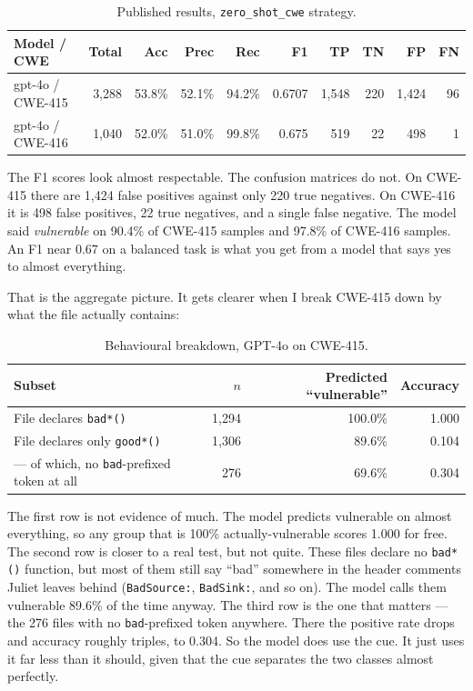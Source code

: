 \documentclass[11pt]{article}
\begin{document}
\begin{table}[h!]
\centering
\begin{tabular}{lrrrrrrrrr}
\toprule
Model / CWE & Total & Acc & Prec & Rec & F1 & TP & TN & FP & FN \\
\midrule
gpt-4o / CWE-415 & 3,288 & 53.8\% & 52.1\% & 94.2\% & 0.6707 & 1,548 & 220 & 1,424 & 96 \\
gpt-4o / CWE-416 & 1,040 & 52.0\% & 51.0\% & 99.8\% & 0.675 & 519 & 22 & 498 & 1 \\
\bottomrule
\end{tabular}
\caption{Published results, \texttt{zero\_shot\_cwe} strategy.}
\end{table}

The F1 scores look almost respectable. The confusion matrices do not. On CWE-415 there are 1,424
false positives against only 220 true negatives. On CWE-416 it is 498 false positives, 22 true
negatives, and a single false negative. The model said \textit{vulnerable} on 90.4\% of CWE-415
samples and 97.8\% of CWE-416 samples. An F1 near 0.67 on a balanced task is what you get from a
model that says yes to almost everything.

That is the aggregate picture. It gets clearer when I break CWE-415 down by what the file
actually contains:

\begin{table}[h!]
\centering
\begin{tabular}{lrrr}
\toprule
Subset & $n$ & Predicted ``vulnerable'' & Accuracy \\
\midrule
File declares \texttt{bad*()} & 1,294 & 100.0\% & 1.000 \\
File declares only \texttt{good*()} & 1,306 & 89.6\% & 0.104 \\
\quad --- of which, no \texttt{bad}-prefixed token at all & 276 & 69.6\% & 0.304 \\
\bottomrule
\end{tabular}
\caption{Behavioural breakdown, GPT-4o on CWE-415.}
\end{table}

The first row is not evidence of much. The model predicts vulnerable on almost everything, so any
group that is 100\% actually-vulnerable scores 1.000 for free. The second row is closer to a real
test, but not quite. These files declare no \texttt{bad*()} function, but most of them still say
``bad'' somewhere in the header comments Juliet leaves behind (\texttt{BadSource:},
\texttt{BadSink:}, and so on). The model calls them vulnerable 89.6\% of the time anyway. The
third row is the one that matters --- the 276 files with no \texttt{bad}-prefixed token anywhere.
There the positive rate drops and accuracy roughly triples, to 0.304. So the model does use the
cue. It just uses it far less than it should, given that the cue separates the two classes almost
perfectly.
\end{document}
